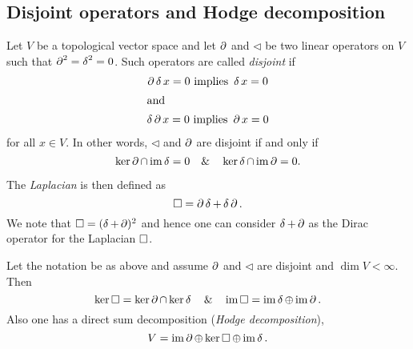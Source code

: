 \documentclass[12pt,a4paper,final]{report}
\begin{document}
\subsection{Disjoint operators and Hodge decomposition}

Let $V$ be a topological vector space and let $\lcd$ and $\lhd$ be two linear operators on $V$ such that $\lcd^2 = \lhd^2 = 0$. Such operators are called \emph{disjoint} if
\begin{gather*}
 \lcd\lhd x= 0 \text{ implies } \lhd x =0 \\
 \intertext{and}
 \lhd \lcd x = 0 \text{ implies } \lcd x = 0
\end{gather*}
for all $x\in V$. In other words, $\lhd$ and $\lcd$ are disjoint if and only if
\begin{equation}\label{eq:disjointness}
 \ker \lcd \cap \im \lhd = 0 \quad \& \quad \ker \lhd \cap \im \lcd = 0.
\end{equation}


The \emph{Laplacian} is then defined as
\[\lap = \lcd \lhd + \lhd \lcd.\] We note that $\lap  = (\lhd + \lcd)^2$ and hence one can consider $\lhd + \lcd$ as the Dirac operator for the Laplacian $\lap$. %

\begin{proposition}%
 Let the notation be as above and assume $\lcd$ and $\lhd$ are disjoint and $\dim V < \infty$. Then
 \begin{equation}\label{eq:hodge_decomp_aux}
  \ker \lap = \ker \lcd \cap \ker\lhd \quad \& \quad  \im \lap = \im \lhd \oplus \im \lcd.
 \end{equation}
 Also one has a direct sum decomposition (\emph{Hodge decomposition}),
 \begin{equation}\label{eq:hodge_decomp}
    V = \im \lcd \oplus \ker \lap \oplus \im \lhd.
 \end{equation}
\end{proposition}
%
\end{document}
